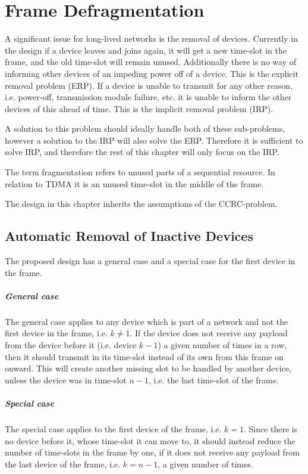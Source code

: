 \chapter{Frame Defragmentation}
A significant issue for long-lived networks is the removal of devices. 
Currently in the design if a device leaves and joins again, it will get a new time-slot in the frame, and the old time-slot will remain unused.
Additionally there is no way of informing other devices of an impeding power off of a device. 
This is the explicit removal problem (ERP). 
If a device is unable to transmit for any other reason, i.e. power-off, transmission module failure, etc. it is unable to inform the other devices of this ahead of time. 
This is the implicit removal problem (IRP). 

A solution to this problem should ideally handle both of these sub-problems, however a solution to the IRP will also solve the ERP.
Therefore it is sufficient to solve IRP, and therefore the rest of this chapter will only focus on the IRP.  

The term fragmentation refers to unused parts of a sequential resource. 
In relation to TDMA it is an unused time-slot in the middle of the frame. 

The design in this chapter inherits the assumptions of the CCRC-problem. 

\section{Automatic Removal of Inactive Devices}
The proposed design has a general case and a special case for the first device in the frame.
\paragraph{General case}
The general case applies to any device which is part of a network and not the first device in the frame, i.e. $k \neq 1$.
If the device does not receive any payload from the device before it (i.e. device $k - 1$) a given number of times in a row, then it should transmit in its time-slot instead of its own from this frame on onward. 
This will create another missing slot to be handled by another device, unless the device was in time-slot $n - 1$, i.e. the last time-slot of the frame. 

\paragraph{Special case}
The special case applies to the first device of the frame, i.e. $k = 1$. 
Since there is no device before it, whose time-slot it can move to, it should instead reduce the number of time-slots in the frame by one, if it does not receive any payload from the last device of the frame, i.e. $k = n - 1$, a given number of times. 

